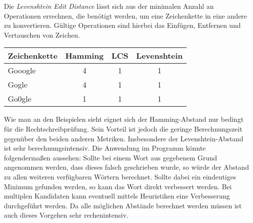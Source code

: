 \newline
Die \textit{Levenshtein Edit Distance} lässt sich aus der minimalen Anzahl an Operationen errechnen, die benötigt werden, um eine Zeichenkette in eine andere zu konvertieren. Gültige Operationen sind hierbei das Einfügen, Entfernen und Vertauschen von Zeichen.
\newline
\begin{tabular}{|l|ccc|}
\hline
Zeichenkette & Hamming & LCS & Levenshtein \\
\hline
Gooogle & 4 & 1 & 1 \\
Gogle & 4 & 1 & 1 \\
Go0gle & 1 & 1 & 1 \\
\hline
\end{tabular}
\newline
Wie man an den Beispielen sieht eignet sich der Hamming-Abstand nur bedingt für die Rechtschreibprüfung. Sein Vorteil ist jedoch die geringe Berechnungszeit gegenüber den beiden anderen Metriken. Insbesondere der Levenshtein-Abstand ist sehr berechnungsintensiv.
\newline
Die Anwendung im Programm könnte folgendermaßen aussehen: Sollte bei einem Wort aus gegebenem Grund angenommen werden, dass dieses falsch geschrieben wurde, so würde der Abstand zu allen weiteren verfügbaren Wörtern berechnet. Sollte dabei ein eindeutiges Minimum gefunden werden, so kann das Wort direkt verbessert werden. Bei multiplen Kandidaten kann eventuell mittels Heuristiken eine Verbesserung durchgeführt werden. Da alle möglichen Abstände berechnet werden müssen ist auch dieses Vorgehen sehr rechenintensiv.


